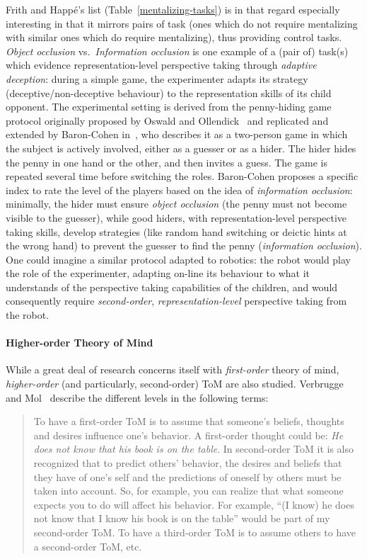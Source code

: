 \documentclass{sig-alternate}
\begin{document}
Frith and Happé's list (Table~\ref{mentalizing-tasks}) is in that regard
especially interesting in that it mirrors pairs of task (ones which do not
require mentalizing with similar ones which do require mentalizing), thus
providing control tasks.  \emph{Object occlusion} vs.~\emph{Information
occlusion} is one example of a (pair of) task(s) which evidence
representation-level perspective taking through \emph{adaptive deception}:
during a simple game, the experimenter adapts its strategy
(deceptive/non-deceptive behaviour) to the representation skills of its child
opponent. The experimental setting is derived from the penny-hiding game
protocol originally proposed by Oswald and Ollendick~\cite{oswald1989role} and
replicated and extended by Baron-Cohen in~\cite{baron1992out}, who describes it
as a two-person game in which the subject is actively involved, either as a
guesser or as a hider. The hider hides the penny in one hand or the other, and
then invites a guess. The game is repeated several time before switching the
roles. Baron-Cohen proposes a specific index to rate the level of the players
based on the idea of \emph{information occlusion}: minimally, the hider must
ensure \emph{object occlusion} (the penny must not become visible to the
guesser), while good hiders, with representation-level perspective taking
skills, develop strategies (like random hand switching or deictic hints at the
wrong hand) to prevent the guesser to find the penny (\emph{information
occlusion}). One could imagine a similar protocol adapted to robotics: the robot
would play the role of the experimenter, adapting on-line its
behaviour to what it understands of the perspective taking capabilities of the
children, and would consequently require \emph{second-order},
\emph{representation-level} perspective taking from the robot.



\paragraph{Higher-order Theory of Mind}

While a great deal of research concerns itself with \emph{first-order} theory of
mind, \emph{higher-order} (and particularly, second-order) ToM are also studied.
Verbrugge and Mol~\cite{verbrugge2008learning} describe the different levels in
the following terms:
\begin{quote}
To have a first-order ToM is to assume that someone's beliefs, thoughts and
desires influence one's behavior. A first-order thought could be: \emph{He does not
know that his book is on the table}. In second-order ToM it is also recognized
that to predict others' behavior, the desires and beliefs that they have of
one's self and the predictions of oneself by others must be taken into account.
So, for example, you can realize that what someone expects you to do will affect
his behavior. For example, ``(I know) he does not know that I know his book is on
the table'' would be part of my second-order ToM. To have a third-order ToM is to
assume others to have a second-order ToM, etc.
\end{quote}
\end{document}
